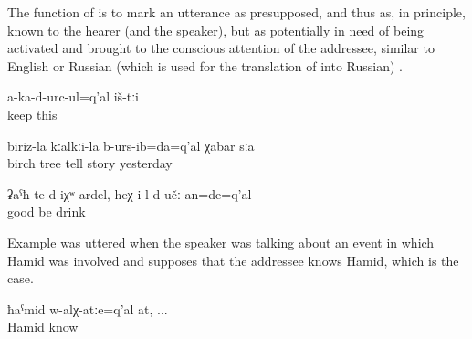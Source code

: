 The function of  is to mark an utterance as presupposed, and thus as, in principle, known to the hearer (and the speaker), but as potentially in need of being activated and brought to the conscious attention of the addressee, similar to English  or Russian  (which is used for the translation of  into Russian) .
%
\begin{exe}
	\ex	\label{ex:These (pictures) do not fit (on the table or in that order) minor}
	\gll	a-ka-d-urc-ul=q'al	iš-tːi\\
		keep	this\\
	\glt	{}

	\ex	\label{ex:Yesterday I already told the story about the birch tree minor}
	\gll	biriz-la	kːalkːi-la	b-urs-ib=da=q'al	χabar	sːa\\
		birch	tree	tell	story	yesterday\\
	\glt	{}

	\ex	\label{ex:If (the drinks) would be good, he would drink them minor}
	\gll	ʡaˁħ-te	d-iχʷ-ardel,	heχ-i-l	d-učː-an=de=q'al\\
		good 	be	 drink\\
	\glt	{}
\end{exe}

Example  was uttered when the speaker was talking about an event in which Hamid was involved and supposes that the addressee knows Hamid, which is the case.
%
\begin{exe}
	\ex	\label{ex:Hamid, if you know him minor}
	\gll	ħaˁmid	w-alχ-atːe=q'al	at, ...\\
		Hamid	know	\\
	\glt	{}
\end{exe}

